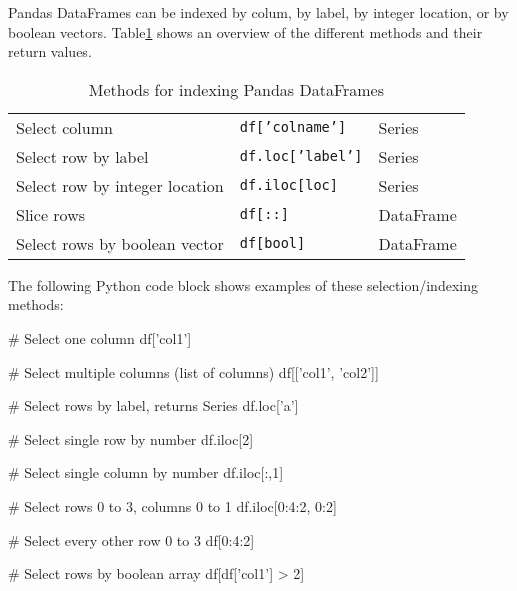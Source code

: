 



Pandas DataFrames can be indexed by colum, by label, by integer location, or by boolean vectors. Table\ref{tab:pandasindexing} shows an overview of the different methods and their return values.

\begin{table}[h]
\centering
\renewcommand{\arraystretch}{1.25}
\begin{tabular}{l|l|l} \hline
Select column & \texttt{df['colname']} & Series \\
Select row by label & \texttt{df.loc['label']}  & Series \\
Select row by integer location & \texttt{df.iloc[loc]} & Series \\
Slice rows & \texttt{df[::]} & DataFrame \\
Select rows by boolean vector & \texttt{df[bool]} & DataFrame \\ \hline
\end{tabular}
\caption{Methods for indexing Pandas DataFrames}
\label{tab:pandasindexing}
\end{table}

\begin{samepage}
The following Python code block shows examples of these selection/indexing methods:
\begin{pythoncode}
# Select one column
df['col1']

# Select multiple columns (list of columns)
df[['col1', 'col2']]

# Select rows by label, returns Series
df.loc['a']

# Select single row by number
df.iloc[2]

# Select single column by number
df.iloc[:,1]

# Select rows 0 to 3, columns 0 to 1
df.iloc[0:4:2, 0:2] 

# Select every other row 0 to 3
df[0:4:2]

# Select rows by boolean array
df[df['col1'] > 2]
\end{pythoncode}
\end{samepage}

